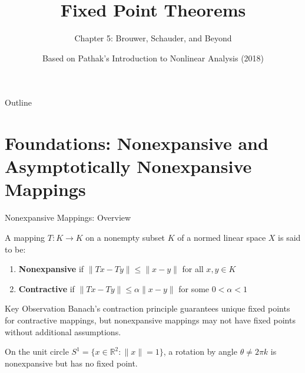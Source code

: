 \documentclass[aspectratio=169,10pt]{beamer}
\title{Fixed Point Theorems}
\subtitle{Chapter 5: Brouwer, Schauder, and Beyond}
\author{Based on Pathak's Introduction to Nonlinear Analysis (2018)}
\date{}
\begin{document}
\frame{\titlepage}

\begin{frame}[allowframebreaks]{Outline}
\tableofcontents
\end{frame}

\section{Foundations: Nonexpansive and Asymptotically Nonexpansive Mappings}

\begin{frame}[allowframebreaks]{Nonexpansive Mappings: Overview}
    \begin{definition}
        A mapping $T: K \to K$ on a nonempty subset $K$ of a normed linear space $X$ is said to be:
        \begin{enumerate}
            \item \textbf{Nonexpansive} if $\|Tx - Ty\| \le \|x - y\|$ for all $x,y \in K$
            \item \textbf{Contractive} if $\|Tx - Ty\| \le \alpha\|x - y\|$ for some $0 < \alpha < 1$
        \end{enumerate}
    \end{definition}

    \begin{block}{Key Observation}
        Banach's contraction principle guarantees unique fixed points for contractive mappings, but nonexpansive mappings may not have fixed points without additional assumptions.
    \end{block}

    \begin{example}
        On the unit circle $S^1 = \{x \in \mathbb{R}^2: \|x\| = 1\}$, a rotation by angle $\theta \neq 2\pi k$ is nonexpansive but has no fixed point.
    \end{example}
\end{frame}
\end{document}
